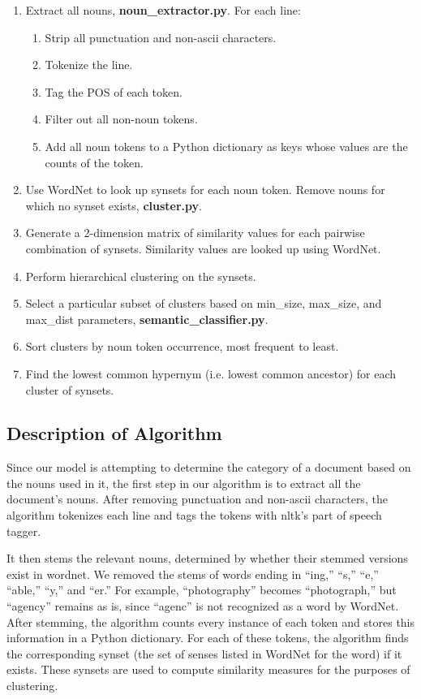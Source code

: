 \documentclass[12pt]{article}
\begin{document}
\begin{enumerate}  
\item Extract all nouns, \textbf{noun\_extractor.py}. For each line:
\begin{enumerate}
\item Strip all punctuation and non-ascii characters.
\item Tokenize the line.
\item Tag the POS of each token.
\item Filter out all non-noun tokens.
\item Add all noun tokens to a Python dictionary as keys whose values are the counts of the token.
\end{enumerate}
\item Use WordNet to look up synsets for each noun token. Remove nouns for which no synset exists, \textbf{cluster.py}.
\item Generate a 2-dimension matrix of similarity values for each pairwise combination of synsets. Similarity values are looked up using WordNet.
\item Perform hierarchical clustering on the synsets.
\item Select a particular subset of clusters based on min\_size, max\_size, and max\_dist parameters, \textbf{semantic\_classifier.py}.
\item Sort clusters by noun token occurrence, most frequent to least.
\item Find the lowest common hypernym (i.e. lowest common ancestor) for each cluster of synsets.
\end{enumerate}

\subsection{Description of Algorithm}

Since our model is attempting to determine the category of a document based on the nouns used in it, the first step in our algorithm is to extract all the document's nouns. After removing punctuation and non-ascii characters, the algorithm tokenizes each line and tags the tokens with nltk's part of speech tagger. 

It then stems the relevant nouns, determined by whether their stemmed versions exist in wordnet. We removed the stems of words ending in ``ing,'' ``s,'' ``e,'' ``able,'' ``y,'' and ``er.'' For example, ``photography'' becomes ``photograph,'' but ``agency'' remains as is, since ``agenc'' is not recognized as a word by WordNet. After stemming, the algorithm counts every instance of each token and stores this information in a Python dictionary. For each of these tokens, the algorithm finds the corresponding synset (the set of senses listed in WordNet for the word) if it exists. These synsets are used to compute similarity measures for the purposes of clustering.
\end{document}
